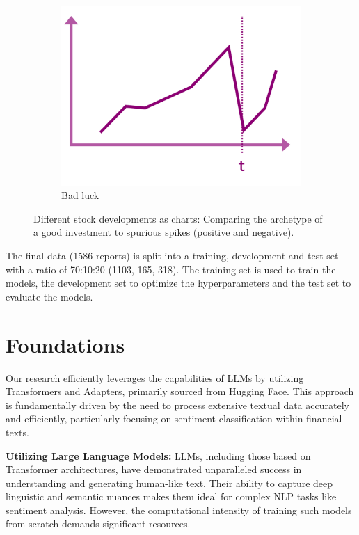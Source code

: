 \documentclass[conference]{IEEEtran}
\begin{document}
\begin{figure}[h!]
\begin{subfigure}{.33\linewidth}
        \centering
        \includegraphics[width=\linewidth]{../5. report/pictures/preproccessing3.png}
        \caption{Bad luck}
        \label{fig:preprocessing3}
    \end{subfigure}
    \caption{Different stock developments as charts: Comparing the archetype of a good investment to spurious spikes (positive and negative). }
    \label{fig:preprocessing}
\end{figure}

The final data (1586 reports) is split into a training, development and test set with a ratio of 70:10:20 (1103, 165, 318). The training set is used to train the models, the development set to optimize the hyperparameters and the test set to evaluate the models. 
\section{Foundations} %
Our research efficiently leverages the capabilities of LLMs by utilizing Transformers and Adapters, primarily sourced from Hugging Face. This approach is fundamentally driven by the need to process extensive textual data accurately and efficiently, particularly focusing on sentiment classification within financial texts.

\textbf{Utilizing Large Language Models:} LLMs, including those based on Transformer architectures, have demonstrated unparalleled success in understanding and generating human-like text. Their ability to capture deep linguistic and semantic nuances makes them ideal for complex NLP tasks like sentiment analysis. However, the computational intensity of training such models from scratch demands significant resources.
\end{document}
